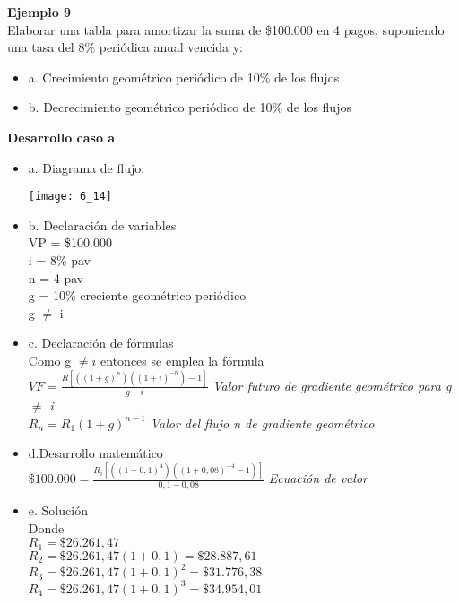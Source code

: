 	\textbf{Ejemplo 9}\\
	Elaborar una tabla para amortizar la suma de \$100.000 en 4 pagos, suponiendo una tasa del 8\% periódica anual vencida y:
	\begin{itemize}
		\item a. Crecimiento geométrico periódico de 10\% de los flujos
		\item b. Decrecimiento geométrico periódico de 10\% de los flujos
	\end{itemize}
	\textbf{Desarrollo caso a}
	\begin{itemize}
		\item a. Diagrama de flujo:\\
		\begin{center}
			\texttt{[image: 6\_14]}
		\end{center}
		\item b. Declaración de variables\\
		VP = \$100.000 \\		
		i = 8\% pav \\
		n = 4 pav \\
		g = 10\% creciente geométrico periódico\\
		g $\not=$ i\\
		
		\item c. Declaración de fórmulas\\
		Como g $\not = i$ entonces se emplea la fórmula \\
		$VF = \frac{R[((1+g)^n)((1+i)^{-n})-1]}{g-i}$ \hspace{35 pt} \textit{Valor futuro de gradiente geométrico para g $\not=$ i}\\ 
		$R_{n} = R_{1}(1+g)^{n-1}$ \hspace{20 pt} \textit{Valor del flujo n de gradiente geométrico}\\
		\item d.Desarrollo matemático\\
		$\$100.000 = \frac{R_{i}[((1+0,1)^{4})((1+0,08)^{-4}-1)]}{0,1-0,08}$ \hspace{35 pt} \textit{Ecuación de valor}\\
		\item e. Solución\\
		Donde\\
		$R_{1} = \$26.261,47$\\
		$R_{2} = \$26.261,47(1+0,1) = \$28.887,61$\\
		$R_{3} = \$26.261,47(1+0,1)^2 = \$31.776,38$\\
		$R_{4} = \$26.261,47(1+0,1)^3 = \$34.954,01 $\\
		

\end{itemize}

